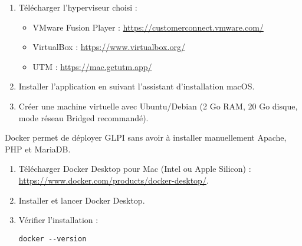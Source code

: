 \documentclass[11pt,a4paper]{article}
\begin{document}
\begin{tcolorbox}[title={2. Installation d’un hyperviseur sur Mac}]
\begin{enumerate}
  \item Télécharger l’hyperviseur choisi :  
    \begin{itemize}
      \item VMware Fusion Player : \url{https://customerconnect.vmware.com/}  
      \item VirtualBox : \url{https://www.virtualbox.org/}  
      \item UTM : \url{https://mac.getutm.app/}  
    \end{itemize}
  \item Installer l’application en suivant l’assistant d’installation macOS.  
  \item Créer une machine virtuelle avec Ubuntu/Debian (2 Go RAM, 20 Go disque, mode réseau Bridged recommandé).  
\end{enumerate}
\end{tcolorbox}

\begin{tcolorbox}[title={3. Installation de Docker Desktop}]
Docker permet de déployer GLPI sans avoir à installer manuellement Apache, PHP et MariaDB.  
\begin{enumerate}
  \item Télécharger Docker Desktop pour Mac (Intel ou Apple Silicon) : \url{https://www.docker.com/products/docker-desktop/}.  
  \item Installer et lancer Docker Desktop.  
  \item Vérifier l’installation :
\begin{verbatim}
docker --version
\end{verbatim}
\end{enumerate}
\end{tcolorbox}
\end{document}

